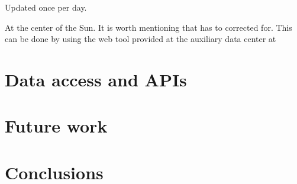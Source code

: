 \documentclass{aa}
\begin{document}
Updated once per day.

At the center of the Sun.
It is worth mentioning that has to corrected for.
This can be done by using the web tool provided at the auxiliary data center at


\section{Data access and APIs}
\section{Future work}
\section{Conclusions}




%
%



\end{document}
